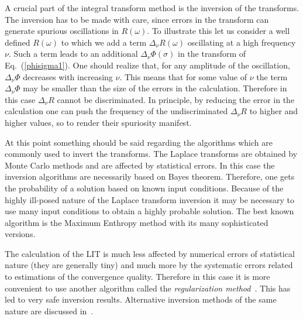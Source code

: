 A crucial part of the  integral transform method  is the inversion of the transforms. 
The inversion  has to be made with care, since errors in the transform can generate spurious oscillations in $R(\omega)$. 
To illustrate this let us consider a well defined $R(\omega)$ to which we add a
term $\Delta_\nu R(\omega)$ oscillating at a high frequency $\nu$. Such a term leads 
to an additional $\Delta_\nu \Phi (\sigma)$ in the transform of Eq.~(\ref{phisigma1}). One should realize that, for any
amplitude of the oscillation, $\Delta_\nu \Phi$ decreases with increasing $\nu$.
This means that for some value of $\nu$ the term $\Delta_\nu \Phi$ may be 
 smaller than the size of the errors in the
calculation. Therefore in this case  $\Delta_\nu R$ cannot be discriminated. In principle, by reducing
the error in the calculation one can push the frequency of the undiscriminated $\Delta_\nu R$ 
to higher and higher values, so to render their spuriosity manifest. 

At this point something should be said  regarding the  algorithms which are commonly used to invert  the transforms. 
The Laplace transforms are obtained by
Monte Carlo methods and are affected by statistical errors. In this case the inversion algorithms are necessarily based on 
Bayes theorem. Therefore,  one gets  
the probability of a solution  based on known input conditions. Because of the highly ill-posed nature of the Laplace transform 
inversion it may be necessary to use many input conditions to obtain a highly probable solution.
The best known algorithm  is the Maximum Enthropy method\cite{MEM_book} with its many  sophisticated versions. 

The calculation of the LIT is much less affected by numerical errors of statistical nature (they are generally tiny) 
and much more by the systematic errors related to  estimations of  the convergence quality. Therefore in this case it is more 
convenient to use another algorithm  called the {\it regularization method}~\cite{TIKHONOV:1977}.
This has led to very safe inversion results. Alternative inversion methods of the same nature are discussed in~\cite{ANDREASI:2005}. 

